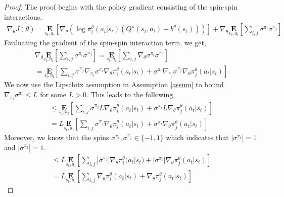 \documentclass{article}
\begin{document}
\begin{proof}

    The proof begins with the policy gradient consisting of the spin-spin interactions,
    \begin{gather}
        \nabla_{\theta}J(\theta) = \underset{s_{t},a_{t}}{\textbf{E}}[\nabla_{\theta}(\log \pi^{\theta}_{i}(a_{t}|s_{t})(Q^{\pi}(s_{t},a_{t}) + b^{\theta}(s_{t})))] + \nabla_{\theta}\underset{s_{t},a_{t}}{\textbf{E}}[\sum_{i,j} \sigma^{\pi_{i}}\sigma^{\pi_{j}}] \label{eq:grad}
    \end{gather}
    Evaluating the gradient of the spin-spin interaction term, we get,
    \begin{gather}
        \nabla_{\theta} \underset{s_{t},a_{t}}{\textbf{E}}[\sum_{i,j} \sigma^{\pi_{i}}\sigma^{\pi_{j}}] = \underset{s_{t},a_{t}}{\textbf{E}}[\sum_{i,j} \nabla_{\theta}\sigma^{\pi_{i}}\sigma^{\pi_{j}}] \nonumber \\
        = \underset{s_{t},a_{t}}{\textbf{E}}[\sum_{i,j} \sigma^{\pi_{j}} \nabla_{\pi_{i}}\sigma^{\pi_{i}}\nabla_{\theta}\pi^{\theta}_{i}(a_{t}|s_{t}) + \sigma^{\pi_{i}} \nabla_{\pi_{j}}\sigma^{\pi_{j}}\nabla_{\theta}\pi^{\theta}_{j}(a_{t}|s_{t})] \nonumber
    \end{gather}
    We now use the Lipschitz assumption in Assumption \autoref{assum} to bound $\nabla_{\pi_{i}}\sigma^{\pi_{i}} \leq L$ for some $L > 0$. This leads to the following,
    \begin{gather}
        \leq \underset{s_{t},a_{t}}{\textbf{E}}[\sum_{i,j} \sigma^{\pi_{j}} L\nabla_{\theta}\pi^{\theta}_{i}(a_{t}|s_{t}) + \sigma^{\pi_{i}} L\nabla_{\theta}\pi^{\theta}_{j}(a_{t}|s_{t})] \nonumber \\
        = L\underset{s_{t},a_{t}}{\textbf{E}}[\sum_{i,j} \sigma^{\pi_{j}} \nabla_{\theta}\pi^{\theta}_{i}(a_{t}|s_{t}) + \sigma^{\pi_{i}} \nabla_{\theta}\pi^{\theta}_{j}(a_{t}|s_{t})] \nonumber        
    \end{gather}
    Moreover, we know that the spins $\sigma^{\pi_{i}},\sigma^{\pi_{j}} \in \{-1,1\}$ which indicates that $|\sigma^{\pi_{i}}|=1$ and $|\sigma^{\pi_{j}}|=1$.
    \begin{gather}
        \leq L\underset{s_{t},a_{t}}{\textbf{E}}[\sum_{i,j} |\sigma^{\pi_{j}}| \nabla_{\theta}\pi^{\theta}_{i}(a_{t}|s_{t}) + |\sigma^{\pi_{i}}| \nabla_{\theta}\pi^{\theta}_{j}(a_{t}|s_{t})] \nonumber \\       
        = L\underset{s_{t},a_{t}}{\textbf{E}}[\sum_{i,j} \nabla_{\theta}\pi^{\theta}_{i}(a_{t}|s_{t}) + \nabla_{\theta}\pi^{\theta}_{j}(a_{t}|s_{t})] \nonumber        

\end{gather}
\end{proof}
\end{document}
